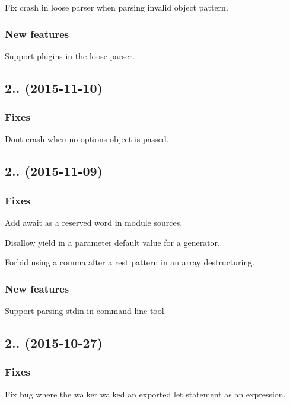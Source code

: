 Fix crash in loose parser when parsing invalid object pattern.

\subsubsection*{New features}

Support plugins in the loose parser.

\subsection*{2.. (2015-\/11-\/10)}

\subsubsection*{Fixes}

Don\textquotesingle{}t crash when no options object is passed.

\subsection*{2.. (2015-\/11-\/09)}

\subsubsection*{Fixes}

Add {\ttfamily await} as a reserved word in module sources.

Disallow {\ttfamily yield} in a parameter default value for a generator.

Forbid using a comma after a rest pattern in an array destructuring.

\subsubsection*{New features}

Support parsing stdin in command-\/line tool.

\subsection*{2.. (2015-\/10-\/27)}

\subsubsection*{Fixes}

Fix bug where the walker walked an exported {\ttfamily let} statement as an expression.

